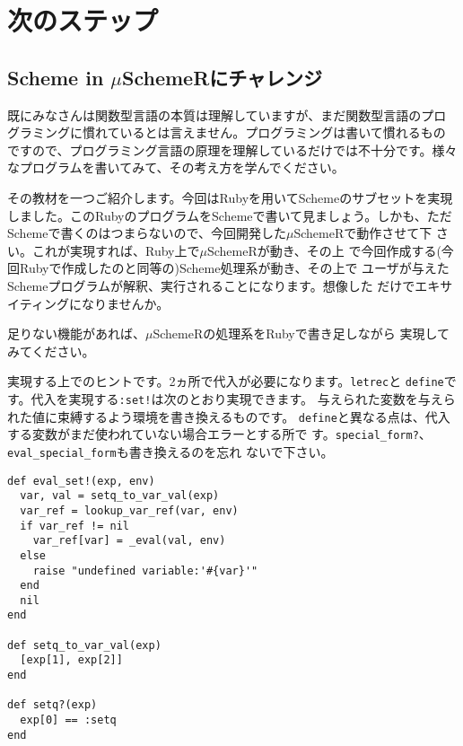 \chapter{次のステップ\hspace{-3mm}}

\section{Scheme in $\mu$SchemeRにチャレンジ}
既にみなさんは関数型言語の本質は理解していますが、まだ関数型言語のプロ
グラミングに慣れているとは言えません。プログラミングは書いて慣れるもの
ですので、プログラミング言語の原理を理解しているだけでは不十分です。様々
なプログラムを書いてみて、その考え方を学んでください。

その教材を一つご紹介します。今回はRubyを用いてSchemeのサブセットを実現
しました。このRubyのプログラムをSchemeで書いて見ましょう。しかも、ただ
Schemeで書くのはつまらないので、今回開発した$\mu$SchemeRで動作させて下
さい。これが実現すれば、Ruby上で$\mu$SchemeRが動き、その上
で今回作成する(今回Rubyで作成したのと同等の)Scheme処理系が動き、その上で
ユーザが与えたSchemeプログラムが解釈、実行されることになります。想像した
だけでエキサイティングになりませんか。

足りない機能があれば、$\mu$SchemeRの処理系をRubyで書き足しながら
実現してみてください。

実現する上でのヒントです。2ヵ所で代入が必要になります。{\tt letrec}と
{\tt define}です。代入を実現する{\tt :set!}は次のとおり実現できます。
与えられた変数を与えられた値に束縛するよう環境を書き換えるものです。
{\tt define}と異なる点は、代入する変数がまだ使われていない場合エラーとする所で
す。{\tt special\_form?}、{\tt eval\_special\_form}も書き換えるのを忘れ
ないで下さい。

\begin{lstlisting}
def eval_set!(exp, env)
  var, val = setq_to_var_val(exp)
  var_ref = lookup_var_ref(var, env)
  if var_ref != nil
    var_ref[var] = _eval(val, env)
  else
    raise "undefined variable:'#{var}'"    
  end
  nil
end

def setq_to_var_val(exp)
  [exp[1], exp[2]]
end

def setq?(exp)
  exp[0] == :setq
end
\end{lstlisting}



